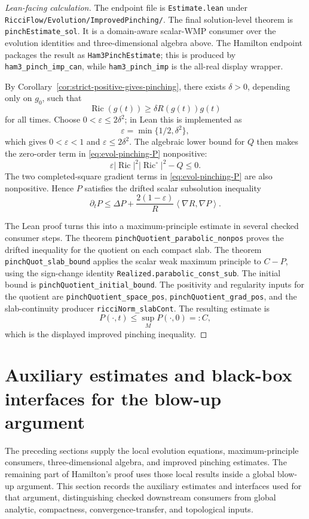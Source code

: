 \documentclass[11pt]{article}
\theoremstyle{plain}
\theoremstyle{definition}
\theoremstyle{remark}
\newcommand{\Ric}{\operatorname{Ric}}
\newcommand{\ip}[2]{\left\langle #1,#2\right\rangle}
\newcommand{\norm}[1]{\left|#1\right|}
\newcommand{\eps}{\varepsilon}
\newcommand{\del}{\delta}
\newcommand{\leanref}[1]{\nolinkurl{#1}}
\newcommand{\leanfile}[1]{\nolinkurl{#1}}
\newcommand{\rffile}[1]{\leanfile{#1}}
\newcommand{\rfdir}[1]{\leanfile{#1/}}
\begin{document}
\begin{proof}[Lean-facing calculation]
The endpoint file is \rffile{Estimate.lean} under
\rfdir{RicciFlow/Evolution/ImprovedPinching}.  The final solution-level theorem
is \leanref{pinchEstimate_sol}.  It is a domain-aware scalar-WMP consumer over
the evolution identities and three-dimensional algebra above.  The Hamilton
endpoint packages the result as \leanref{Ham3PinchEstimate}; this is produced
by \leanref{ham3_pinch_imp_can}, while \leanref{ham3_pinch_imp} is the
all-real display wrapper.

By Corollary~\ref{cor:strict-positive-gives-pinching}, there exists
\(\delta>0\), depending only on \(g_0\), such that
\[
\Ric(g(t))\ge\del R(g(t))g(t)
\]
for all times.  Choose \(0<\eps\le2\delta^2\); in Lean this is implemented as
\[
  \eps=\min\{1/2,\delta^2\},
\]
which gives \(0<\eps<1\) and \(\eps\le2\delta^2\).  The algebraic lower bound
for \(Q\) then makes the zero-order term in \eqref{eq:evol-pinching-P}
nonpositive:
\[
  \eps\norm{\Ric}^2\norm{\Ric^\circ}^2-Q\le0.
\]
The two completed-square gradient terms in \eqref{eq:evol-pinching-P} are also
nonpositive.  Hence \(P\) satisfies the drifted scalar subsolution inequality
\[
\partial_tP
\le
\Delta P+
\frac{2(1-\eps)}{R}\ip{\nabla R}{\nabla P}.
\]

The Lean proof turns this into a maximum-principle estimate in several checked
consumer steps.  The theorem \leanref{pinchQuotient_parabolic_nonpos} proves
the drifted inequality for the quotient on each compact slab.  The theorem
\leanref{pinchQuot_slab_bound} applies the scalar weak maximum principle to
\(C-P\), using the sign-change identity \leanref{Realized.parabolic_const_sub}.
The initial bound is \leanref{pinchQuotient_initial_bound}.  The positivity and
regularity inputs for the quotient are \leanref{pinchQuotient_space_pos},
\leanref{pinchQuotient_grad_pos}, and the slab-continuity producer
\leanref{ricciNorm_slabCont}.  The resulting estimate is
\[
  P(\cdot,t)\le \sup_M P(\cdot,0)=:C,
\]
which is the displayed improved pinching inequality.
\end{proof}


\section{Auxiliary estimates and black-box interfaces for the blow-up argument}

The preceding sections supply the local evolution equations, maximum-principle
consumers, three-dimensional algebra, and improved pinching estimates.  The
remaining part of Hamilton's proof uses those local results inside a global
blow-up argument.  This section records the auxiliary estimates and interfaces
used for that argument, distinguishing checked downstream consumers from global
analytic, compactness, convergence-transfer, and topological inputs.
\end{document}
